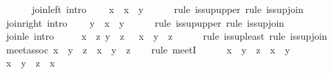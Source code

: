\begin{isabellebody}
\ \ \isamarkupfalse%
\isanewline
\isanewline
\ \ \isamarkupfalse%
\ join{\isacharunderscore}left\ {\isacharbrackleft}intro{\isacharquery}{\isacharbrackright}{\isacharcolon}\isanewline
\ \ \ \ {\isachardoublequoteopen}x\ {\isasymsqsubseteq}\ x\ {\isasymsqunion}\ y{\isachardoublequoteclose}\isanewline
\ \ \ \ \isamarkupfalse%
\ {\isacharparenleft}rule\ is{\isacharunderscore}sup{\isacharunderscore}upper{\isacharparenright}\ {\isacharparenleft}rule\ is{\isacharunderscore}sup{\isacharunderscore}join{\isacharparenright}\isanewline
\isanewline
\ \ \isamarkupfalse%
\ join{\isacharunderscore}right\ {\isacharbrackleft}intro{\isacharquery}{\isacharbrackright}{\isacharcolon}\isanewline
\ \ \ \ {\isachardoublequoteopen}y\ {\isasymsqsubseteq}\ x\ {\isasymsqunion}\ y{\isachardoublequoteclose}\isanewline
\ \ \ \ \isamarkupfalse%
\ {\isacharparenleft}rule\ is{\isacharunderscore}sup{\isacharunderscore}upper{\isacharparenright}\ {\isacharparenleft}rule\ is{\isacharunderscore}sup{\isacharunderscore}join{\isacharparenright}\isanewline
\isanewline
\ \ \isamarkupfalse%
\ join{\isacharunderscore}le\ {\isacharbrackleft}intro{\isacharquery}{\isacharbrackright}{\isacharcolon}\isanewline
\ \ \ \ {\isachardoublequoteopen}{\isasymlbrakk}\ x\ {\isasymsqsubseteq}\ z{\isacharsemicolon}\ y\ {\isasymsqsubseteq}\ z\ {\isasymrbrakk}\ {\isasymLongrightarrow}\ x\ {\isasymsqunion}\ y\ {\isasymsqsubseteq}\ z{\isachardoublequoteclose}\isanewline
\ \ \ \ \isamarkupfalse%
\ {\isacharparenleft}rule\ is{\isacharunderscore}sup{\isacharunderscore}least{\isacharparenright}\ {\isacharparenleft}rule\ is{\isacharunderscore}sup{\isacharunderscore}join{\isacharparenright}\isanewline
\isanewline
\ \ \isamarkupfalse%
\ meet{\isacharunderscore}assoc{\isacharcolon}\ {\isachardoublequoteopen}{\isacharparenleft}x\ {\isasymsqinter}\ y{\isacharparenright}\ {\isasymsqinter}\ z\ {\isacharequal}\ x\ {\isasymsqinter}\ {\isacharparenleft}y\ {\isasymsqinter}\ z{\isacharparenright}{\isachardoublequoteclose}\isanewline
\ \ \isamarkupfalse%
\ {\isacharparenleft}rule\ meetI{\isacharparenright}\isanewline
\ \ \ \ \isamarkupfalse%
\ {\isachardoublequoteopen}x\ {\isasymsqinter}\ {\isacharparenleft}y\ {\isasymsqinter}\ z{\isacharparenright}\ {\isasymsqsubseteq}\ x\ {\isasymsqinter}\ y{\isachardoublequoteclose}\isanewline
\ \ \ \ \isamarkupfalse%
\isanewline
\ \ \ \ \ \ \isamarkupfalse%
\ {\isachardoublequoteopen}x\ {\isasymsqinter}\ {\isacharparenleft}y\ {\isasymsqinter}\ z{\isacharparenright}\ {\isasymsqsubseteq}\ x{\isachardoublequoteclose}\ \isacommand{{\isachardot}{\isachardot}}\isamarkupfalse%

\end{isabellebody}
